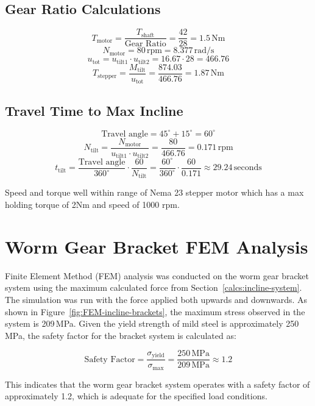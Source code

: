\subsection*{Gear Ratio Calculations}

\[
T_{\text{motor}} = \frac{T_{\text{shaft}}}{\text{Gear Ratio}} = \frac{42}{28} = 1.5 \, \text{Nm}
\]
\[
N_{\text{motor}} = 80 \, \text{rpm} = 8.377 \, \text{rad/s}
\]
\[
u_{\text{tot}} = u_{\text{tilt1}} \cdot u_{\text{tilt2}} = 16.67 \cdot 28 = 466.76
\]
\[
T_{\text{stepper}} = \frac{M_{\text{tilt}}}{u_{\text{tot}}} = \frac{874.03}{466.76} = 1.87 \, \text{Nm}
\]

\subsection*{Travel Time to Max Incline}

\[
\text{Travel angle} = 45^\circ + 15^\circ = 60^\circ
\]
\[
N_{\text{tilt}} = \frac{N_{\text{motor}}}{u_{\text{tilt1}} \cdot u_{\text{tilt2}}} = \frac{80}{466.76} = 0.171 \, \text{rpm}
\]
\[
t_{\text{tilt}} = \frac{\text{Travel angle}}{360^\circ} \cdot \frac{60}{N_{\text{tilt}}} = \frac{60^\circ}{360^\circ} \cdot \frac{60}{0.171} \approx 29.24 \, \text{seconds}
\]

Speed and torque well within range of Nema 23 stepper motor which has a max holding torque of 2Nm and speed of 1000 rpm.

\normalsize %

\section{Worm Gear Bracket FEM Analysis}
\label{calcs:worm-bracket-fem}
Finite Element Method (FEM) analysis was conducted on the worm gear bracket system using the maximum calculated force from Section~\ref{calcs:incline-system}. The simulation was run with the force applied both upwards and downwards. As shown in Figure~\ref{fig:FEM-incline-brackets}, the maximum stress observed in the system is 209\,MPa. Given the yield strength of mild steel is approximately 250\,MPa, the safety factor for the bracket system is calculated as:

\[
\text{Safety Factor} = \frac{\sigma_{\text{yield}}}{\sigma_{\text{max}}} = \frac{250 \, \text{MPa}}{209 \, \text{MPa}} \approx 1.2
\]

This indicates that the worm gear bracket system operates with a safety factor of approximately 1.2, which is adequate for the specified load conditions.



